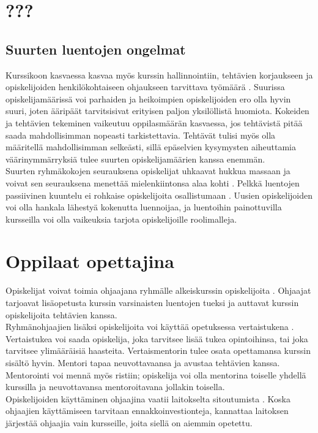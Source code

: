 \documentclass[finnish]{tktltiki2}
\theoremstyle{definition}
\theoremstyle{remark}
\begin{document}
\section{???}

\subsection{Suurten luentojen ongelmat}

Kurssikoon kasvaessa kasvaa myös kurssin hallinnointiin, tehtävien korjaukseen ja opiskelijoiden henkilökohtaiseen ohjaukseen tarvittava työmäärä \cite{Kay98}. Suurissa opiskelijamäärissä voi parhaiden ja heikoimpien opiskelijoiden ero olla hyvin suuri, joten ääripäät tarvitsisivat erityisen paljon yksilöllistä huomiota. Kokeiden ja tehtävien tekeminen vaikeutuu oppilasmäärän kasvaessa, jos tehtävistä pitää saada mahdollisimman nopeasti tarkistettavia. Tehtävät tulisi myös olla määritellä mahdollisimman selkeästi, sillä epäselvien kysymysten aiheuttamia väärinymmärryksiä tulee suurten opiskelijamäärien kanssa enemmän.
\\
Suurten ryhmäkokojen seurauksena opiskelijat uhkaavat hukkua massaan ja voivat sen seurauksena menettää mielenkiintonsa alaa kohti \cite{Kay98}. Pelkkä luentojen passiivinen kuuntelu ei rohkaise opiskelijoita osallistumaan \cite{Kopp00}. Uusien opiskelijoiden voi olla hankala lähestyä kokenutta luennoijaa, ja luentoihin painottuvilla kursseilla voi olla vaikeuksia tarjota opiskelijoille roolimalleja.   


\section{Oppilaat opettajina}
Opiskelijat voivat toimia ohjaajana ryhmälle alkeiskurssin o\-pis\-ke\-li\-joi\-ta \cite{Reges88}. Ohjaajat tarjoavat lisäopetusta kurssin varsinaisten luentojen tueksi ja auttavat kurssin opiskelijoita tehtävien kanssa.
\\
Ryhmänohjaajien lisäksi opiskelijoita voi käyttää opetuksessa vertaistukena \cite{Tashakkori05}. Vertaistukea voi saada opiskelija, joka tarvitsee lisää tukea opintoihinsa, tai joka tarvitsee ylimääräisiä haasteita. Vertaismentorin tulee osata opettamansa  kurssin sisältö hyvin. Mentori tapaa neuvottavaansa ja avustaa tehtävien kanssa. Mentorointi voi mennä myös ristiin; opiskelija voi olla mentorina toiselle yhdellä kurssilla ja neuvottavansa mentoroitavana jollakin toisella.
\\
Opiskelijoiden käyttäminen ohjaajina vaatii laitokselta sitoutumista \cite{Kopp00}. Koska ohjaajien käyttämiseen tarvitaan ennakkoinvestionteja, kannattaa laitoksen järjestää ohjaajia vain kursseille, joita siellä on aiemmin opetettu. 
\end{document}
